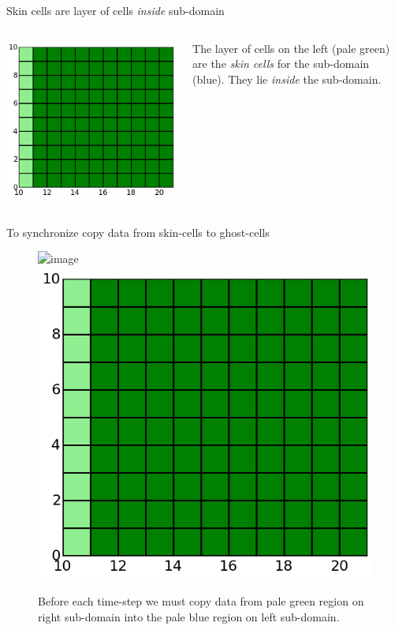 \documentclass[aspectratio=169]{beamer}
\newcommand{\incfig}{\centering\includegraphics}
\begin{document}
\begin{frame}{Skin cells are layer of cells \emph{inside} sub-domain}

  \begin{columns}
    
    \begin{column}{0.6\linewidth}
      \includegraphics[width=0.9\linewidth]{skin-cells.png}
    \end{column}
    
    \begin{column}{0.4\linewidth}
      The layer of cells on the left (pale green) are the \emph{skin
        cells} for the sub-domain (blue). They lie \emph{inside} the
      sub-domain.
    \end{column}
  \end{columns}  

\end{frame}

\begin{frame}{To synchronize copy data from skin-cells to ghost-cells}

  \begin{figure}
    \incfig{ghost-cells.png}
    \incfig{skin-cells.png}
    \caption{Before each time-step we must copy data from pale green
      region on right sub-domain into the pale blue region on left
      sub-domain.}
  \end{figure}  

\end{frame}
\end{document}
